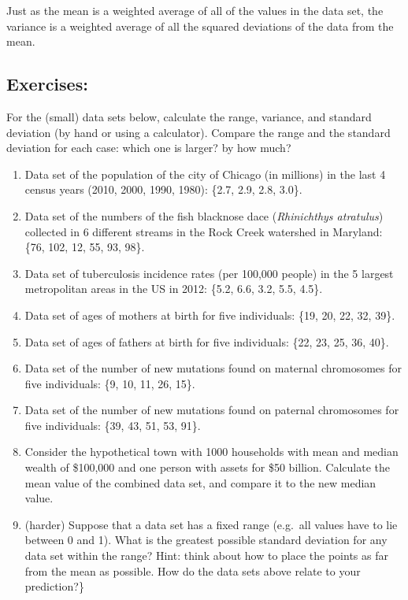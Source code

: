 \documentclass[
]{book}
\theoremstyle{definition}
\theoremstyle{definition}
\theoremstyle{definition}
\theoremstyle{remark}
\begin{document}
Just as the mean is a weighted average of all of the values in the data set, the variance is a weighted average of all the squared deviations of the data from the mean.

\hypertarget{exercises-7}{%
\subsection{Exercises:}\label{exercises-7}}

For the (small) data sets below, calculate the range, variance, and standard deviation (by hand or using a calculator). Compare the range and the standard deviation for each case: which one is larger? by how much?

\begin{enumerate}
\def\labelenumi{\arabic{enumi}.}
\item
  Data set of the population of the city of Chicago (in millions) in the last 4 census years (2010, 2000, 1990, 1980): \{2.7, 2.9, 2.8, 3.0\}.
\item
  Data set of the numbers of the fish blacknose dace (\emph{Rhinichthys atratulus}) collected in 6 different streams in the Rock Creek watershed in Maryland: \{76, 102, 12, 55, 93, 98\}.
\item
  Data set of tuberculosis incidence rates (per 100,000 people) in the 5 largest metropolitan areas in the US in 2012: \{5.2, 6.6, 3.2, 5.5, 4.5\}.
\item
  Data set of ages of mothers at birth for five individuals: \{19, 20, 22, 32, 39\}.
\item
  Data set of ages of fathers at birth for five individuals: \{22, 23, 25, 36, 40\}.
\item
  Data set of the number of new mutations found on maternal chromosomes for five individuals: \{9, 10, 11, 26, 15\}.
\item
  Data set of the number of new mutations found on paternal chromosomes for five individuals: \{39, 43, 51, 53, 91\}.
\item
  Consider the hypothetical town with 1000 households with mean and median wealth of \$100,000 and one person with assets for \$50 billion. Calculate the mean value of the combined data set, and compare it to the new median value.
\item
  (harder) Suppose that a data set has a fixed range (e.g.~all values have to lie between 0 and 1). What is the greatest possible standard deviation for any data set within the range? Hint: think about how to place the points as far from the mean as possible. How do the data sets above relate to your prediction?\}
\end{enumerate}
\end{document}
